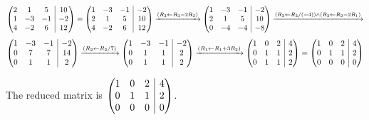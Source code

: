 \documentclass{article}
\makeatletter
\newenvironment{amatrix}[1]{\left(\begin{array}{@{}*{#1}{c}|c@{}}}{\end{array}\right)}
\makeatother
\begin{document}
\begin{equation*}
  \begin{amatrix}{3}
    2 & 1 & 5 & 10 \\
    1 & -3 & -1 & -2 \\
    4 & -2 & 6 & 12
  \end{amatrix} =
  \begin{amatrix}{3}
    1 & -3 & -1 & -2 \\
    2 & 1 & 5 & 10 \\
    4 & -2 & 6 & 12
  \end{amatrix}
  \xrightarrow{(R_{3} \leftarrow R_{3} - 2R_{2})}
  \begin{amatrix}{3}
    1 & -3 & -1 & -2 \\
    2 & 1 & 5 & 10 \\
    0 & -4 & -4 & -8
  \end{amatrix}
  \xrightarrow{(R_{3} \leftarrow R_{3} / (-4)) \land (R_{2} \leftarrow R_{2} - 2R_{1})}
\end{equation*}
\begin{equation*} 
  \begin{amatrix}{3}
    1 & -3 & -1 & -2 \\
    0 & 7 & 7 & 14 \\
    0 & 1 & 1 & 2
  \end{amatrix}
  \xrightarrow{(R_{2} \leftarrow R_{2} / 7)}
  \begin{amatrix}{3}
    1 & -3 & -1 & -2 \\
    0 & 1 & 1 & 2 \\
    0 & 1 & 1 & 2
  \end{amatrix}
  \xrightarrow{(R_{1} \leftarrow R_{1} + 3R_{2})}
  \begin{amatrix}{3}
    1 & 0 & 2 & 4 \\
    0 & 1 & 1 & 2 \\
    0 & 1 & 1 & 2
  \end{amatrix} =
   \begin{amatrix}{3}
    1 & 0 & 2 & 4 \\
    0 & 1 & 1 & 2 \\
    0 & 0 & 0 & 0
  \end{amatrix}
\end{equation*}

The reduced matrix is $\begin{amatrix}{3}
    1 & 0 & 2 & 4 \\
    0 & 1 & 1 & 2 \\
    0 & 0 & 0 & 0
  \end{amatrix}$.
\end{document}
